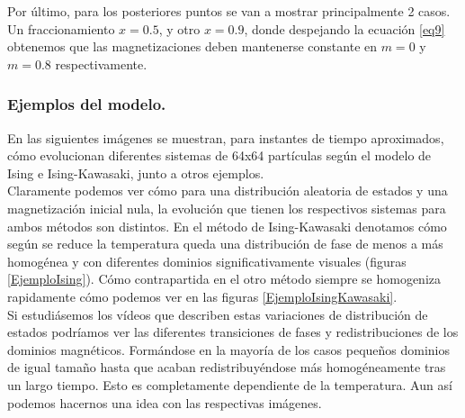 \documentclass[12pt,paper]{article}
\begin{document}
Por último, para los posteriores puntos se van a mostrar principalmente 2 casos. Un fraccionamiento $x=0.5$,  y otro $x=0.9$, donde despejando la ecuación \ref{eq9} obtenemos que las magnetizaciones deben mantenerse constante en $m=0$ y $m = 0.8$ respectivamente.

\subsubsection{Ejemplos del modelo.}    
En las siguientes imágenes se muestran, para instantes de tiempo aproximados, cómo evolucionan diferentes sistemas de 64x64 partículas según el modelo de Ising e Ising-Kawasaki, junto a otros ejemplos.\\
Claramente podemos ver cómo para una distribución aleatoria de estados y una magnetización inicial nula, la evolución que tienen los respectivos sistemas para ambos métodos son distintos. En el método de Ising-Kawasaki denotamos cómo según se reduce la temperatura queda una distribución de fase de menos a más homogénea y con diferentes dominios significativamente visuales (figuras \ref{EjemploIsing}). Cómo contrapartida en el otro método siempre se homogeniza rapidamente cómo podemos ver en las figuras \ref{EjemploIsingKawasaki}.\\
Si estudiásemos los vídeos que describen estas variaciones de distribución de estados podríamos ver las diferentes transiciones de fases y redistribuciones de los dominios magnéticos. Formándose en la mayoría de los casos pequeños dominios de igual tamaño hasta que acaban redistribuyéndose más homogéneamente tras un largo tiempo. Esto es completamente dependiente de la temperatura. Aun así podemos hacernos una idea con las respectivas imágenes.

\newpage
\end{document}
